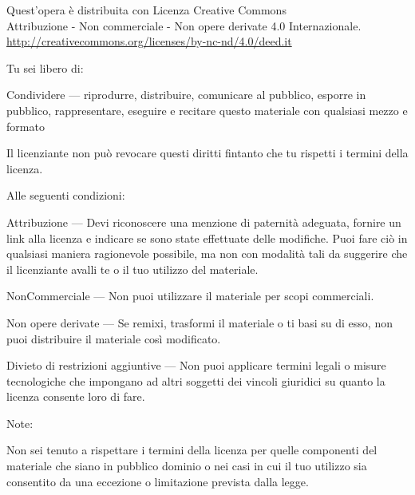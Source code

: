 \cleartorecto
\thispagestyle{plain}

\enlargethispage{\baselineskip}

{\fontsize{9}{13}\selectfont%
\setlength{\parindent}{0pt}%
\raggedright\label{copyright-details}%
\setlength{\parskip}{7pt}%

{\centering

{\LARGE\ccbyncnd}

Quest'opera è distribuita con Licenza Creative Commons\\
Attribuzione - Non commerciale - Non opere derivate 4.0 Internazionale.\\
\href{http://creativecommons.org/licenses/by-nc-nd/4.0/deed.it}{http://creativecommons.org/licenses/by-nc-nd/4.0/deed.it}

}

Tu sei libero di:

\begin{packeditemize}
\item Condividere — riprodurre, distribuire, comunicare al pubblico, esporre in pubblico, rappresentare, eseguire e recitare questo materiale con qualsiasi mezzo e formato
\end{packeditemize}

Il licenziante non può revocare questi diritti fintanto che tu rispetti i termini della licenza.

Alle seguenti condizioni:

\begin{packeditemize}
\item Attribuzione — Devi riconoscere una menzione di paternità adeguata, fornire un link alla licenza e indicare se sono state effettuate delle modifiche. Puoi fare ciò in qualsiasi maniera ragionevole possibile, ma non con modalità tali da suggerire che il licenziante avalli te o il tuo utilizzo del materiale.
\item NonCommerciale — Non puoi utilizzare il materiale per scopi commerciali.
\item Non opere derivate — Se remixi, trasformi il materiale o ti basi su di esso, non puoi distribuire il materiale così modificato.
\end{packeditemize}

Divieto di restrizioni aggiuntive — Non puoi applicare termini legali o misure
tecnologiche che impongano ad altri soggetti dei vincoli giuridici su quanto la
licenza consente loro di fare.

Note:

Non sei tenuto a rispettare i termini della licenza per quelle componenti del
materiale che siano in pubblico dominio o nei casi in cui il tuo utilizzo sia
consentito da una eccezione o limitazione prevista dalla legge.

}
